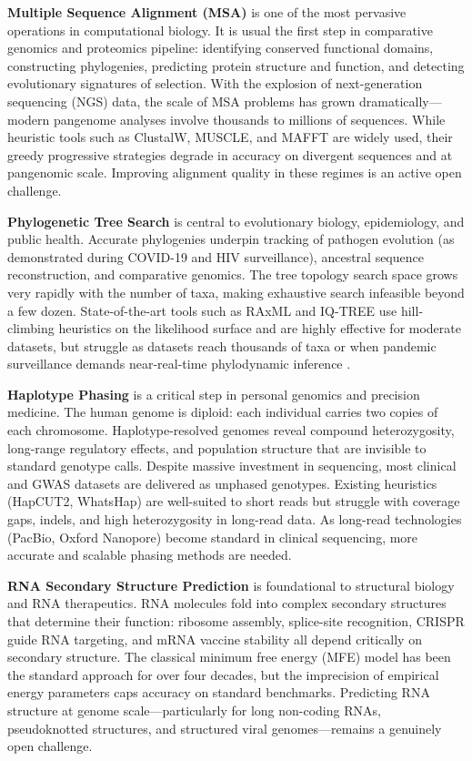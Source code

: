 \documentclass[11pt]{article}
\begin{document}
\textbf{Multiple Sequence Alignment (MSA)} is one of the most pervasive operations in
computational biology. It is usual the first step in comparative
genomics and proteomics pipeline: identifying conserved functional domains, constructing
phylogenies, predicting protein structure and function, and detecting evolutionary
signatures of selection. With the explosion of next-generation sequencing (NGS) data,
the scale of MSA problems has grown dramatically---modern pangenome analyses involve
thousands to millions of sequences. While heuristic tools such as ClustalW, MUSCLE,
and MAFFT are widely used, their greedy progressive strategies degrade in accuracy on
divergent sequences and at pangenomic scale. Improving alignment quality in these
regimes is an active open challenge.
\medskip

\textbf{Phylogenetic Tree Search} is central to evolutionary biology, epidemiology,
and public health. Accurate phylogenies underpin tracking of pathogen evolution
(as demonstrated during COVID-19 and HIV surveillance), ancestral sequence reconstruction,
and comparative genomics. The tree topology search space grows very rapidly with the number of taxa,
making exhaustive search infeasible beyond a few dozen.
State-of-the-art tools such as RAxML and IQ-TREE use hill-climbing heuristics on the
likelihood surface and are highly effective for moderate datasets, but struggle as
datasets reach thousands of taxa or when pandemic surveillance demands near-real-time
phylodynamic inference \cite{Felsenstein1981,Yang2014}.
\medskip

\textbf{Haplotype Phasing} is a critical step in personal genomics and precision medicine.
The human genome is diploid: each individual carries two copies of each chromosome.
Haplotype-resolved genomes reveal compound heterozygosity, long-range regulatory effects,
and population structure that are invisible to standard genotype calls. Despite massive
investment in sequencing, most clinical and GWAS datasets are delivered as unphased
genotypes. Existing heuristics (HapCUT2, WhatsHap) are well-suited to short reads but
struggle with coverage gaps, indels, and high heterozygosity in long-read data.
As long-read technologies (PacBio, Oxford Nanopore) become standard in clinical
sequencing, more accurate and scalable phasing methods are needed.
\medskip

\textbf{RNA Secondary Structure Prediction} is foundational to structural biology and
RNA therapeutics. RNA molecules fold into complex secondary structures that determine
their function: ribosome assembly, splice-site recognition, CRISPR guide RNA targeting,
and mRNA vaccine stability all depend critically on secondary structure.
The classical minimum free energy (MFE) model \cite{ZukerStiegler1981,Mathews1999}
has been the standard approach for over four decades, but the imprecision of empirical
energy parameters caps accuracy on standard benchmarks. Predicting RNA structure at
genome scale---particularly for long non-coding RNAs, pseudoknotted structures, and
structured viral genomes---remains a genuinely open challenge.
\medskip
\end{document}
